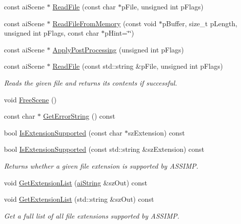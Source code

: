 \begin{DoxyCompactItemize}
const ai\-Scene $\ast$ \hyperlink{class_assimp_1_1_importer_a174418ab41d5b8bc51a044895cb991e5}{Read\-File} (const char $\ast$p\-File, unsigned int p\-Flags)
\item 
const ai\-Scene $\ast$ \hyperlink{class_assimp_1_1_importer_a9b3c5e8b1042702f449e84a95b3324f6}{Read\-File\-From\-Memory} (const void $\ast$p\-Buffer, size\-\_\-t p\-Length, unsigned int p\-Flags, const char $\ast$p\-Hint=\char`\"{}\char`\"{})
\item 
const ai\-Scene $\ast$ \hyperlink{class_assimp_1_1_importer_a5872e749c1451fee64183fc14f1fc81d}{Apply\-Post\-Processing} (unsigned int p\-Flags)
\item 
const ai\-Scene $\ast$ \hyperlink{class_assimp_1_1_importer_a339882c7acb47d5b5110bbd078d870a9}{Read\-File} (const std\-::string \&p\-File, unsigned int p\-Flags)
\begin{DoxyCompactList}\small\item\em Reads the given file and returns its contents if successful. \end{DoxyCompactList}\item 
void \hyperlink{class_assimp_1_1_importer_a53dafc3046abc33365a07c605716c5d4}{Free\-Scene} ()
\item 
const char $\ast$ \hyperlink{class_assimp_1_1_importer_a23bab5ba8cb9b6886c690a610766668b}{Get\-Error\-String} () const 
\item 
bool \hyperlink{class_assimp_1_1_importer_a9146ea75c33c0aac0310195346877388}{Is\-Extension\-Supported} (const char $\ast$sz\-Extension) const 
\item 
bool \hyperlink{class_assimp_1_1_importer_a5b01905366f5bf8d1f89d51f755bf7d2}{Is\-Extension\-Supported} (const std\-::string \&sz\-Extension) const 
\begin{DoxyCompactList}\small\item\em Returns whether a given file extension is supported by A\-S\-S\-I\-M\-P. \end{DoxyCompactList}\item 
void \hyperlink{class_assimp_1_1_importer_a23c85647f7977012d9fef20b36c2d579}{Get\-Extension\-List} (\hyperlink{structai_string}{ai\-String} \&sz\-Out) const 
\item 
void \hyperlink{class_assimp_1_1_importer_a6ab684351c55e170de3c5b7d730b306d}{Get\-Extension\-List} (std\-::string \&sz\-Out) const 
\begin{DoxyCompactList}\small\item\em Get a full list of all file extensions supported by A\-S\-S\-I\-M\-P. \end{DoxyCompactList}\item 

\end{DoxyCompactItemize}

